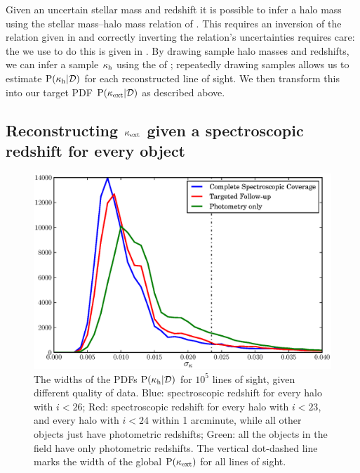 \documentclass[useAMS,usenatbib,a4paper]{mn2e}
\begin{document}

Given an uncertain stellar mass and redshift it is possible to infer a
halo mass using the stellar mass--halo mass relation of
\citet{BehrooziEtal2010}. This \proceedure requires an inversion of the
relation given in \citet{BehrooziEtal2010} and correctly inverting the
relation's uncertainties requires care: the \proceedure we use to do this
is given in . By drawing sample halo masses
and redshifts, we can infer a sample $\kappa_{\rm h}$ using the \proceedure of
; repeatedly drawing samples allows us to
estimate ${\rm P}(\kappa_{\rm h}|{\mathcal{D}})$ for each reconstructed line of sight. We then
transform this into our target PDF ${\rm P}(\kappa_{\rm ext}|{\mathcal{D}})$ as described above.



\subsection{Reconstructing $\kappa_{\rm ext}$ given a spectroscopic redshift for every object}

\begin{figure}
\includegraphics[width=\columnwidth]{figs/Width.eps}
\caption{The widths of the \infered PDFs ${\rm P}(\kappa_{\rm h}|{\mathcal{D}})$ for
$10^5$ lines of sight, given different quality of data. 
Blue: spectroscopic redshift for every halo with $i<26$; 
Red: spectroscopic redshift for every halo with $i<23$, 
and every halo with $i<24$ within 1 arcminute, while all other objects just
have photometric redshifts;
Green: all the objects in the field have only photometric redshifts. The
vertical dot-dashed line marks the width of the global ${\rm P}(\kappa_{\rm ext})$ for all
lines of sight.}
\label{fig:reconwidths}
\end{figure}
\end{document}
